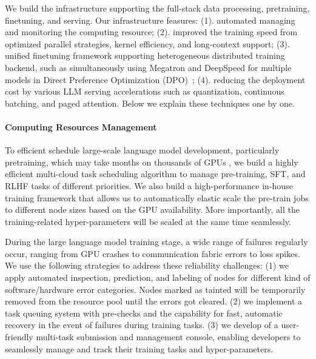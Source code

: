 

We build the infrastructure supporting the full-stack data processing, pretraining, finetuning, and serving. Our infrastructure feasures:
(1). automated managing and monitoring the computing resource; 
(2). improved the training speed from optimized parallel strategies, kernel efficiency, and long-context support;
(3). unified finetuning framework supporting heterogeneous distributed training backend, such as simultaneously using Megatron and DeepSpeed for multiple models in Direct Preference Optimization (DPO)~\citep{rafailov2023direct};
(4). reducing the deployment cost by various LLM serving accelerations such as quantization, continuous batching, and paged attention.
Below we explain these techniques one by one. 

\paragraph{Computing Resources Management} 
To efficient schedule large-scale language model development, particularly pretraining, which may take months on thousands of GPUs , 
we build a highly efficient multi-cloud task scheduling algorithm to manage pre-training, SFT, and RLHF tasks of different priorities. We also build a high-performance in-house training framework that allows us to automatically elastic scale the pre-train jobs to different node sizes based on the GPU availability. More importantly, all the training-related hyper-parameters will be scaled at the same time seamlessly. 

During the large language model training stage, a wide range of failures regularly occur, ranging from GPU crashes to communication fabric errors to loss spikes. We use the following strategies to address these reliability challenges:
(1) we apply automated inspection, prediction, and labeling of nodes for different kind of software/hardware error categories. Nodes marked as tainted will be temporarily removed from the resource pool until the errors got cleared. 
(2) we implement a task queuing system with pre-checks and the capability for fast, automatic recovery in the event of failures during training tasks. 
(3) we develop of a user-friendly multi-task submission and management console, enabling developers to seamlessly manage and track their training tasks and hyper-parameters.

